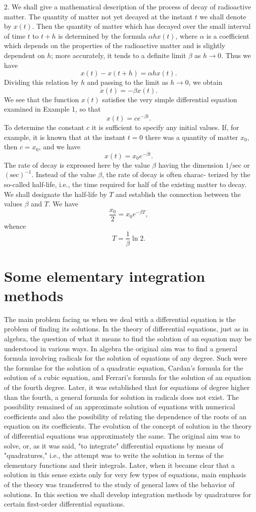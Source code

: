 \documentclass[10pt,a5paper]{book}
\theoremstyle{plain}
\theoremstyle{definition}
\theoremstyle{remark}
\begin{document}
2. We shall give a mathematical description of the process of decay of radioactive matter. The quantity of matter not yet decayed at the instant $t$ we shall denote by $x(t)$. Then the quantity of matter which has decayed over the small interval of time $t$ to $t+h$ is determined by the formula $\alpha h x(t)$, where $\alpha$ is a coefficient which depends on the properties of the radioactive matter and is slightly dependent on $h$; more accurately, it tends to a definite limit $\beta$ as $h \rightarrow 0$. Thus we have
\[
x(t)-x(t+h)=\alpha h x(t) .
\]
Dividing this relation by $h$ and passing to the limit as $h \rightarrow 0$, we obtain
\[
\dot{x}(t)=-\beta x(t) .
\]
We see that the function $x(t)$ satisfies the very simple differential equation examined in Example 1, so that
\[
x(t)=c e^{-\beta t} .
\]
To determine the constant $c$ it is sufficient to specify any initial values. If, for example, it is known that at the instant $t=0$ there was a quantity of matter $x_{0}$, then $c=x_{0}$, and we have
\[
x(t)=x_{0} e^{-\beta t} .
\]
The rate of decay is expressed here by the value $\beta$ having the dimension $1 / \mathrm{sec}$ or $(\mathrm{sec})^{-1}$. Instead of the value $\beta$, the rate of decay is often charac-
terized by the so-called half-life, i.e., the time required for half of the existing matter to decay. We shall designate the half-life by $T$ and establish the connection between the values $\beta$ and $T$. We have
\[
\frac{x_{0}}{2}=x_{0} e^{-\beta T},
\]
whence
\[
T=\frac{1}{\beta} \ln 2 .
\]

\section{Some elementary integration methods}
The main problem facing us when we deal with a differential equation is the problem of finding its solutions. In the theory of differential equations, just as in algebra, the question of what it means to find the solution of an equation may be understood in various ways. In algebra the original aim was to find a general formula involving radicals for the solution of equations of any degree. Such were the formulae for the solution of a quadratic equation, Cardan's formula for the solution of a cubic equation, and Ferrari's formula for the solution of an equation of the fourth degree. Later, it was established that for equations of degree higher than the fourth, a general formula for solution in radicals does not exist. The possibility remained of an approximate solution of equations with numerical coefficients and also the possibility of relating the dependence of the roots of an equation on its coefficients. The evolution of the concept of solution in the theory of differential equations was approximately the same. The original aim was to solve, or, as it was said, "to integrate" differential equations by means of "quadratures," i.e., the attempt was to write the solution in terms of the elementary functions and their integrals. Later, when it became clear that a solution in this sense exists only for very few types of equations, main emphasis of the theory was transferred to the study of general laws of the behavior of solutions. In this section we shall develop integration methods by quadratures for certain first-order differential equations.
\end{document}
